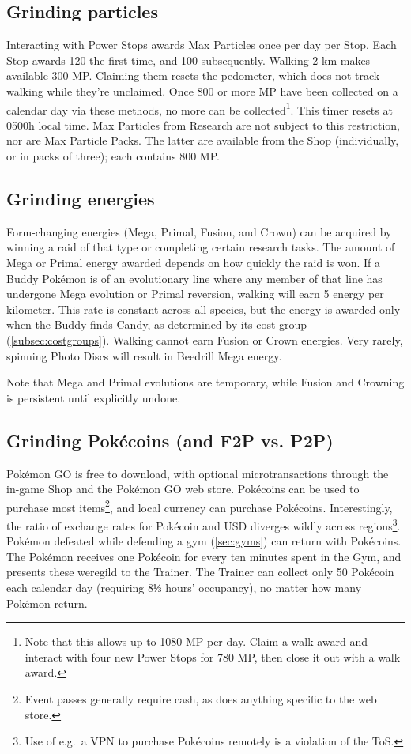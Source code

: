 \subsection{Grinding particles}
Interacting with Power Stops awards Max Particles once per day per Stop.
Each Stop awards 120 the first time, and 100 subsequently.
Walking 2 km makes available 300 MP\@.
Claiming them resets the pedometer, which does not track walking while they're unclaimed.
Once 800 or more MP have been collected on a calendar day via these methods, no
 more can be collected\footnote{Note that this allows up to 1080 MP per day.
 Claim a walk award and interact with four new Power Stops for 780 MP, then
 close it out with a walk award.}.
This timer resets at 0500h local time.
Max Particles from Research are not subject to this restriction, nor are Max Particle Packs.
The latter are available from the Shop (individually, or in packs of three); each contains 800 MP\@.

\subsection{Grinding energies}
Form-changing energies (Mega, Primal, Fusion, and Crown) can be acquired by
 winning a raid of that type or completing certain research tasks.
The amount of Mega or Primal energy awarded depends on how quickly the raid is won.
If a Buddy Pokémon is of an evolutionary line where any member of that line has undergone Mega evolution
  or Primal reversion, walking will earn 5 energy per kilometer.
This rate is constant across all species, but the energy is awarded only when the Buddy finds Candy,
  as determined by its cost group (\autoref{subsec:costgroups}).
Walking cannot earn Fusion or Crown energies.
Very rarely, spinning Photo Discs will result in Beedrill Mega energy.

Note that Mega and Primal evolutions are temporary, while Fusion and Crowning is persistent
  until explicitly undone.
\subsection{Grinding Pokécoins (and F2P vs. P2P)\label{subsec:getcoins}}
Pokémon GO is free to download, with optional microtransactions through the in-game
  Shop and the Pokémon GO web store.
Pokécoins can be used to purchase most items\footnote{Event passes generally require cash,
  as does anything specific to the web store.}, and local currency can purchase Pokécoins.
Interestingly, the ratio of exchange rates for Pokécoin and USD diverges
  wildly across regions\footnote{Use of e.g.\ a VPN to purchase Pokécoins remotely is a violation of the ToS\@.}.
Pokémon defeated while defending a gym (\autoref{sec:gyms}) can return with Pokécoins.
The Pokémon receives one Pokécoin for every ten minutes spent in the Gym, and presents these weregild to the Trainer.
The Trainer can collect only 50 Pokécoin each calendar day (requiring 8⅓ hours' occupancy), no matter how many Pokémon return.

